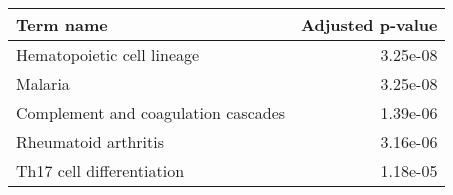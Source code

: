 \begin{tabular}{lr}
\toprule
                          Term name &  Adjusted p-value \\
\midrule
         Hematopoietic cell lineage &          3.25e-08 \\
                            Malaria &          3.25e-08 \\
Complement and coagulation cascades &          1.39e-06 \\
               Rheumatoid arthritis &          3.16e-06 \\
          Th17 cell differentiation &          1.18e-05 \\
\bottomrule
\end{tabular}
